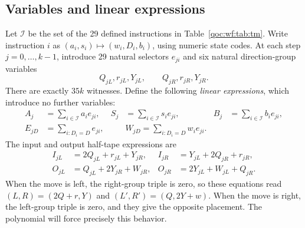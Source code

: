 \documentclass[11pt,letterpaper]{article}
\theoremstyle{definition}
\theoremstyle{remark}
\newcommand{\rulei}{\mathcal I}
\begin{document}
\subsection{Variables and linear expressions}
Let $\rulei$ be the set of the 29 defined instructions in Table~\ref{qoc:wf:tab:tm}. Write instruction $i$ as $(a_i,s_i)\mapsto(w_i,D_i,b_i)$, using numeric state codes. At each step $j=0,\ldots,k-1$, introduce 29 natural selectors $e_{ji}$ and six natural direction-group variables
\[
 Q_{jL},r_{jL},Y_{jL},\qquad Q_{jR},r_{jR},Y_{jR}.
\]
There are exactly $35k$ witnesses. Define the following \emph{linear expressions}, which introduce no further variables:
\begin{align}
 A_j&=\sum_{i\in\rulei}a_i e_{ji},& S_j&=\sum_{i\in\rulei}s_i e_{ji},& B_j&=\sum_{i\in\rulei}b_i e_{ji},\label{qoc:wf:eq:controls}\\
 E_{jD}&=\sum_{i:D_i=D}e_{ji},&&
 W_{jD}=\sum_{i:D_i=D}w_i e_{ji}.\label{qoc:wf:eq:groups}
\end{align}
The input and output half-tape expressions are
\begin{align}
 I_{jL}&=2Q_{jL}+r_{jL}+Y_{jR},&
 I_{jR}&=Y_{jL}+2Q_{jR}+r_{jR},\label{qoc:wf:eq:inputs}\\
 O_{jL}&=Q_{jL}+2Y_{jR}+W_{jR},&
 O_{jR}&=2Y_{jL}+W_{jL}+Q_{jR}.\label{qoc:wf:eq:outputs}
\end{align}
When the move is left, the right-group triple is zero, so these equations read $(L,R)=(2Q+r,Y)$ and $(L',R')=(Q,2Y+w)$. When the move is right, the left-group triple is zero, and they give the opposite placement. The polynomial will force precisely this behavior.
\end{document}
